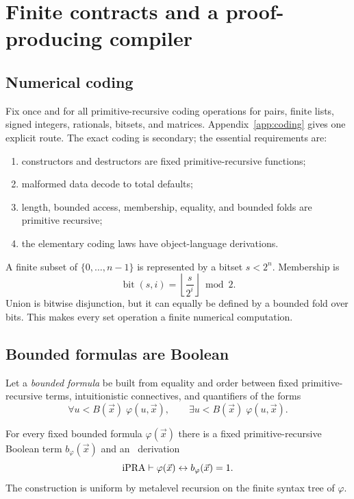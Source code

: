 
\section{Finite contracts and a proof-producing compiler}
\label{sec:contracts}

\subsection{Numerical coding}

Fix once and for all primitive-recursive coding operations for pairs, finite lists, signed integers, rationals, bitsets, and matrices.  Appendix~\ref{app:coding} gives one explicit route.  The exact coding is secondary; the essential requirements are:
\begin{enumerate}
  \item constructors and destructors are fixed primitive-recursive functions;
  \item malformed data decode to total defaults;
  \item length, bounded access, membership, equality, and bounded folds are primitive recursive;
  \item the elementary coding laws have object-language derivations.
\end{enumerate}

A finite subset of $\{0,\ldots,n-1\}$ is represented by a bitset $s<2^{n}$.  Membership is
\[
  \operatorname{bit}(s,i)=\left\lfloor\frac{s}{2^{i}}\right\rfloor\bmod2.
\]
Union is bitwise disjunction, but it can equally be defined by a bounded fold over bits.  This makes every set operation a finite numerical computation.

\subsection{Bounded formulas are Boolean}

Let a \emph{bounded formula} be built from equality and order between fixed primitive-recursive terms, intuitionistic connectives, and quantifiers of the forms
\[
  \forall u<B(\vec x)\;\varphi(u,\vec x),
  \qquad
  \exists u<B(\vec x)\;\varphi(u,\vec x).
\]

\begin{theorem}
\label{thm:booleanization}
For every fixed bounded formula $\varphi(\vec x)$ there is a fixed primitive-recursive Boolean term $b_{\varphi}(\vec x)$ and an \ipra\ derivation
\[
  \mathrm{iPRA}\vdash
  \varphi(\vec x)\leftrightarrow b_{\varphi}(\vec x)=1.
\]
The construction is uniform by metalevel recursion on the finite syntax tree of $\varphi$.
\end{theorem}

